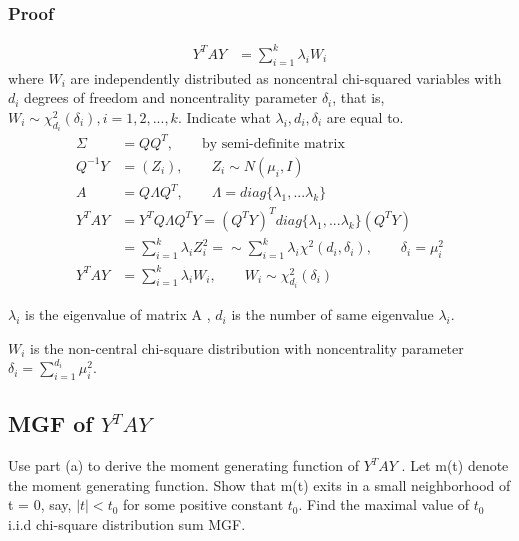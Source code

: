 \documentclass[11pt]{article} %
\begin{document}
\subsubsection{Proof}	


	\begin{align*}
		Y^T A Y &= \sum_{i=1}^k \lambda_i W_i     
	\end{align*} 
	where $W_i$ are independently distributed as noncentral chi-squared variables with $d_i$ degrees of freedom and noncentrality parameter $\delta_i$, that is, $W_i \sim \chi^2_{ d_i}(\delta_i), i =
	1, 2, ..., k$. Indicate what $\lambda_i, d_i, \delta_i$ are equal to.\\
	\begin{align*}
		\Sigma &= QQ^T, \qquad \text{by semi-definite matrix}\\
		Q^{-1}Y & = (Z_i), \qquad  Z_i \sim N(\mu_i, I) \\
		A &= Q \Lambda Q^T, \qquad \Lambda = diag\{ \lambda_1, ... \lambda_k \}\\
		Y^T A Y &= Y^T Q \Lambda Q^T Y = (Q^T Y)^T diag\{ \lambda_1, ... \lambda_k \} (Q^T Y)\\
		& = \sum_{i=1}^k \lambda_i Z_i^2= \sim \sum_{i=1}^k \lambda_i \chi^2 (d_i, \delta_i), \qquad \delta_i = \mu_i^2\\
		Y^T A Y &= \sum_{i=1}^k \lambda_i W_i ,\qquad W_i \sim \chi^2_{d_i}(\delta_i) 
	\end{align*} 

	$\lambda_i$ is the eigenvalue of matrix A , $d_i$ is the number of same eigenvalue $\lambda_i$.
	
	$W_i$ is the non-central chi-square distribution with noncentrality parameter $\delta_i = \sum_{i=1}^{d_i} \mu_i^2$. 
	
	\subsection{MGF of $Y^TAY$}
	Use part (a) to derive the moment generating function of $Y^TAY$ . Let
	m(t) denote the moment generating function. Show that m(t) exits in a small neighborhood
	of t = 0, say, $|t| < t_0$ for some positive constant $t_0$. Find the maximal value
	of $ t_0$	i.i.d chi-square distribution sum MGF.
\end{document}
